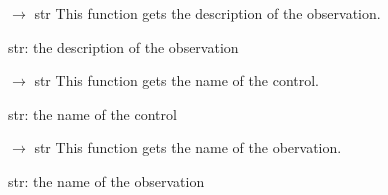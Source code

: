 \documentclass[letterpaper,10pt,english]{sphinxmanual}
\begin{document}
\begin{fulllineitems}

\begin{fulllineitems}
\label{\detokenize{scrimp:scrimp.control.Control_Port.get_description_observation}}
\pysigstartsignatures
\pysiglinewithargsret
{}
{}
{{ $\rightarrow$ str}}
\pysigstopsignatures
\sphinxAtStartPar
This function gets the description of the observation.
\begin{description}
\sphinxAtStartPar
str: the description of the observation

\end{description}

\end{fulllineitems}


\begin{fulllineitems}
\label{\detokenize{scrimp:scrimp.control.Control_Port.get_name_control}}
\pysigstartsignatures
\pysiglinewithargsret
{}
{}
{{ $\rightarrow$ str}}
\pysigstopsignatures
\sphinxAtStartPar
This function gets the name of the control.
\begin{description}
\sphinxAtStartPar
str: the name of the control

\end{description}

\end{fulllineitems}


\begin{fulllineitems}
\label{\detokenize{scrimp:scrimp.control.Control_Port.get_name_obervation}}
\pysigstartsignatures
\pysiglinewithargsret
{}
{}
{{ $\rightarrow$ str}}
\pysigstopsignatures
\sphinxAtStartPar
This function gets the name of the obervation.
\begin{description}
\sphinxAtStartPar
str: the name of the observation


\end{description}
\end{fulllineitems}
\end{fulllineitems}
\end{document}
